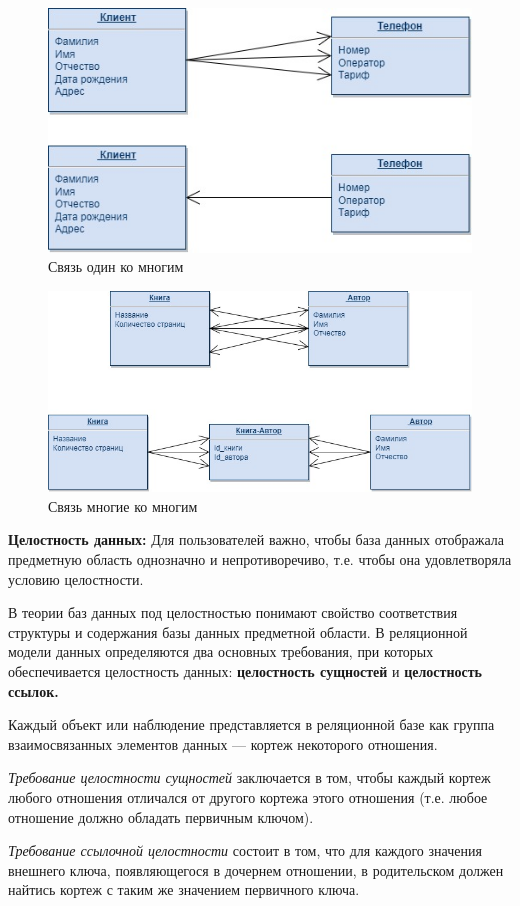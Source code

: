 \begin{figure}[!h]
    \centering
    \includegraphics[scale = 0.5]{1/1kn.jpg}
    \caption{Связь один ко многим}
    \label{fig:onekn}
\end{figure}

\begin{figure}[!h]
    \centering
    \includegraphics[scale = 0.5]{1/nkn.jpg}
    \caption{Связь многие ко многим}
    \label{fig:nkn}
\end{figure}


\textbf{Целостность данных:} 
Для пользователей важно, чтобы база данных отображала предметную область однозначно и непротиворечиво, т.е. чтобы она удовлетворяла условию целостности.

В теории баз данных под целостностью понимают свойство соответствия структуры и содержания базы данных предметной области. В реляционной модели данных определяются два основных требования, при которых обеспечивается целостность данных: \textbf{целостность сущностей} и \textbf{целостность ссылок.}

Каждый объект или наблюдение представляется в реляционной базе как группа взаимосвязанных элементов данных — кортеж некоторого отношения.

\textit{Требование целостности сущностей} заключается в том, чтобы каждый кортеж любого отношения отличался от другого кортежа этого отношения (т.е. любое отношение должно обладать первичным ключом).

\textit{Требование ссылочной целостности} состоит в том, что для каждого значения внешнего ключа, появляющегося в дочернем отношении, в родительском должен найтись кортеж с таким же значением первичного ключа.
